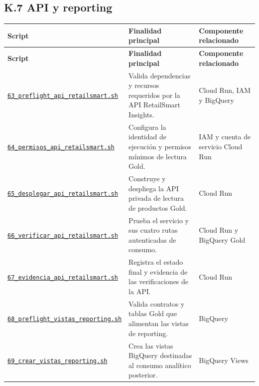 \documentclass[11pt]{article}
\begin{document}
\subsection*{K.7 API y reporting}
\begingroup\scriptsize
\begin{longtable}{@{}>{\raggedright\arraybackslash}p{}>{\raggedright\arraybackslash}p{}>{\raggedright\arraybackslash}p{}@{}}
\toprule
\textbf{Script} & \textbf{Finalidad principal} & \textbf{Componente relacionado} \\
\midrule
\endfirsthead
\toprule
\textbf{Script} & \textbf{Finalidad principal} & \textbf{Componente relacionado} \\
\midrule
\endhead
\href{https://github.com/Codenid/lumina-retail-data-platform/blob/main/implementation/automatizacion/scripts63_preflight_api_retailsmart.sh}{\texttt{63\_\allowbreak{}preflight\_\allowbreak{}api\_\allowbreak{}retailsmart.sh}} & Valida dependencias y recursos requeridos por la API RetailSmart Insights. & Cloud Run, IAM y BigQuery \\
\href{https://github.com/Codenid/lumina-retail-data-platform/blob/main/implementation/automatizacion/scripts64_permisos_api_retailsmart.sh}{\texttt{64\_\allowbreak{}permisos\_\allowbreak{}api\_\allowbreak{}retailsmart.sh}} & Configura la identidad de ejecución y permisos mínimos de lectura Gold. & IAM y cuenta de servicio Cloud Run \\
\href{https://github.com/Codenid/lumina-retail-data-platform/blob/main/implementation/automatizacion/scripts65_desplegar_api_retailsmart.sh}{\texttt{65\_\allowbreak{}desplegar\_\allowbreak{}api\_\allowbreak{}retailsmart.sh}} & Construye y despliega la API privada de lectura de productos Gold. & Cloud Run \\
\href{https://github.com/Codenid/lumina-retail-data-platform/blob/main/implementation/automatizacion/scripts66_verificar_api_retailsmart.sh}{\texttt{66\_\allowbreak{}verificar\_\allowbreak{}api\_\allowbreak{}retailsmart.sh}} & Prueba el servicio y sus cuatro rutas autenticadas de consumo. & Cloud Run y BigQuery Gold \\
\href{https://github.com/Codenid/lumina-retail-data-platform/blob/main/implementation/automatizacion/scripts67_evidencia_api_retailsmart.sh}{\texttt{67\_\allowbreak{}evidencia\_\allowbreak{}api\_\allowbreak{}retailsmart.sh}} & Registra el estado final y evidencia de las verificaciones de la API. & Cloud Run \\
\href{https://github.com/Codenid/lumina-retail-data-platform/blob/main/implementation/automatizacion/scripts68_preflight_vistas_reporting.sh}{\texttt{68\_\allowbreak{}preflight\_\allowbreak{}vistas\_\allowbreak{}reporting.sh}} & Valida contratos y tablas Gold que alimentan las vistas de reporting. & BigQuery \\
\href{https://github.com/Codenid/lumina-retail-data-platform/blob/main/implementation/automatizacion/scripts69_crear_vistas_reporting.sh}{\texttt{69\_\allowbreak{}crear\_\allowbreak{}vistas\_\allowbreak{}reporting.sh}} & Crea las vistas BigQuery destinadas al consumo analítico posterior. & BigQuery Views \\
\bottomrule
\end{longtable}
\endgroup
\end{document}
